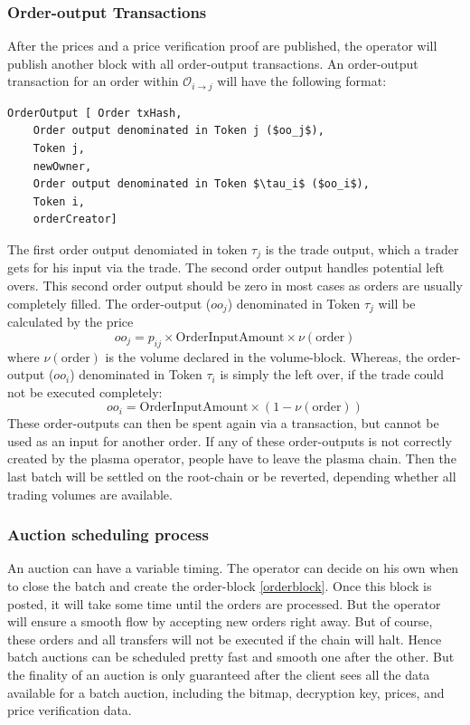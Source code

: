\documentclass[11pt,parskip=full]{scrartcl}%
\def\pO{\mathcal{O}}
\def\ra{\rightarrow}
\begin{document}
\subsubsection{Order-output Transactions}
After the prices and a price verification proof are published, the operator will publish another block with all order-output transactions. 
An order-output transaction for an order within $\pO_{i\ra j}$ will have the following format:

\begin{lstlisting}
OrderOutput [ Order txHash,
    Order output denominated in Token j ($oo_j$), 
    Token j,
    newOwner,
    Order output denominated in Token $\tau_i$ ($oo_i$),
    Token i,
    orderCreator]

\end{lstlisting}
The first order output denomiated in token $\tau_j$ is the trade output, which a trader gets for his input via the trade. 
The second order output handles potential left overs.
This second order output should be zero in most cases as orders are usually completely filled.
The order-output ($oo_j$) denominated in Token $\tau_j$ will be calculated by the price 
\begin{equation}
  oo_j = p_{ij} \times \text{OrderInputAmount} \times \nu(\text{order}) 
    \label{fee_equ}
\end{equation}
where $\nu(\text{order})$ is the volume declared in the volume-block.  
Whereas, the order-output ($oo_i$) denominated in Token $\tau_i$ is simply the left over, if the trade could not be executed completely: 
\begin{equation}
  oo_i =  \text{OrderInputAmount}\times (1 - \nu(\text{order}))
\end{equation}
These order-outputs can then be spent again via a transaction, but cannot be used as an input for another order. 
If any of these order-outputs is not correctly created by the plasma operator, people have to leave the plasma chain. 
Then the last batch will be settled on the root-chain or be reverted, depending whether all trading volumes are available. 



\subsubsection{Auction scheduling process}

An auction can have a variable timing. 
The operator can decide on his own when to close the batch and create the order-block \ref{orderblock}. 
Once this block is posted, it will take some time until the orders are processed. 
But the operator will ensure a smooth flow by accepting new orders right away. 
But of course, these orders and all transfers will not be executed if the chain will halt. 
Hence batch auctions can be scheduled pretty fast and smooth one after the other. 
But the finality of an auction is only guaranteed after the client sees all the data available for a batch auction, including the bitmap, decryption key, prices, and price verification data. 
\end{document}

